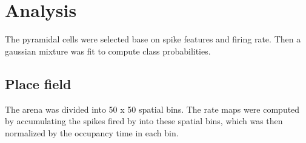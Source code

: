 \section{Analysis}
\label{analysis}


The pyramidal cells were selected base on spike features and firing rate. 
Then a gaussian mixture was fit to compute class probabilities.

\subsection{Place field}
The arena was divided into 50 x 50 spatial bins. The rate maps were computed by accumulating the spikes fired by into these spatial bins, which was then normalized by the occupancy time in each bin. 



